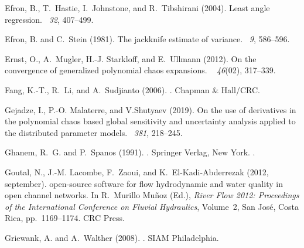 \documentclass[a4paper,11pt]{article}
\theoremstyle{definition}
\theoremstyle{remark}
\theoremstyle{theorem}
\begin{document}
\begin{thebibliography}{}
	Efron, B., T.~Hastie, I.~Johnstone, and R.~Tibshirani (2004).
	\newblock Least angle regression.
	~{\em 32}, 407--499.
	
	Efron, B. and C.~Stein (1981).
	\newblock The jackknife estimate of variance.
	~{\em 9}, 586--596.
	
	Ernst, O., A.~Mugler, H.-J. Starkloff, and E.~Ullmann (2012).
	\newblock On the convergence of generalized polynomial chaos expansions.
	~{\em
		46\/}(02), 317--339.
	
	Fang, K.-T., R.~Li, and A.~Sudjianto (2006).
	.
	\newblock Chapman \& Hall/CRC.
	
	Gejadze, I., P.-O. Malaterre, and V.Shutyaev (2019).
	\newblock On the use of derivatives in the polynomial chaos based global
	sensitivity and uncertainty analysis applied to the distributed parameter
	models.
	~{\em 381}, 218--245.
	
	Ghanem, R.~G. and P.~Spanos (1991).
	.
	\newblock Springer Verlag, New York.
	.
	
	Goutal, N., J.-M. Lacombe, F.~Zaoui, and K.~El-Kadi-Abderrezak (2012,
	september).
	 open-source software for flow hydrodynamic and
	water quality in open channel networks.
	\newblock In R.~Murillo Mu\~noz (Ed.), {\em River Flow 2012: Proceedings of the
		International Conference on Fluvial Hydraulics}, Volume~2, San Jos\'e, Costa
	Rica, pp.\  1169--1174. CRC Press.
	
	Griewank, A. and A.~Walther (2008).
	.
	\newblock SIAM Philadelphia.
	

\end{thebibliography}
\end{document}
